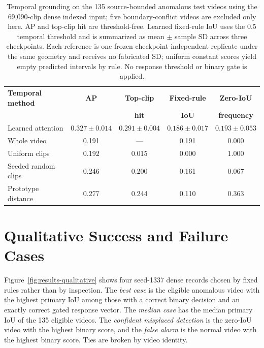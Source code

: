 \begin{table}[tbp]
    \centering
    \small
    \caption[Dense temporal model and frozen references.]{Temporal grounding on the 135 source-bounded anomalous test videos using the 69,090-clip dense indexed input; five boundary-conflict videos are excluded only here. AP and top-clip hit are threshold-free. Learned fixed-rule IoU uses the 0.5 temporal threshold and is summarized as mean $\pm$ sample SD across three checkpoints. Each reference is one frozen checkpoint-independent replicate under the same geometry and receives no fabricated SD; uniform constant scores yield empty predicted intervals by rule. No response threshold or binary gate is applied.}
    \label{tab:results-temporal-baselines}
    \begin{tabular}{@{}lcccc@{}}
        \toprule
        \textbf{Temporal method} & \textbf{AP} & \textbf{Top-clip} & \textbf{Fixed-rule} & \textbf{Zero-IoU} \\
                                  &              & \textbf{hit}      & \textbf{IoU}        & \textbf{frequency} \\
        \midrule
        Learned attention & $0.327 \pm 0.014$ & $0.291 \pm 0.004$ & $0.186 \pm 0.017$ & $0.193 \pm 0.053$ \\
        Whole video & 0.191 & --- & 0.191 & 0.000 \\
        Uniform clips & 0.192 & 0.015 & 0.000 & 1.000 \\
        Seeded random clips & 0.246 & 0.200 & 0.161 & 0.067 \\
        Prototype distance & 0.277 & 0.244 & 0.110 & 0.363 \\
        \bottomrule
    \end{tabular}
\end{table}

\section{Qualitative Success and Failure Cases}
\label{sec:results-qualitative}

Figure~\ref{fig:results-qualitative} shows four seed-1337 dense records chosen by fixed rules rather than by inspection. The \emph{best case} is the eligible anomalous video with the highest primary IoU among those with a correct binary decision and an exactly correct gated response vector. The \emph{median case} has the median primary IoU of the 135 eligible videos. The \emph{confident misplaced detection} is the zero-IoU video with the highest binary score, and the \emph{false alarm} is the normal video with the highest binary score. Ties are broken by video identity.

